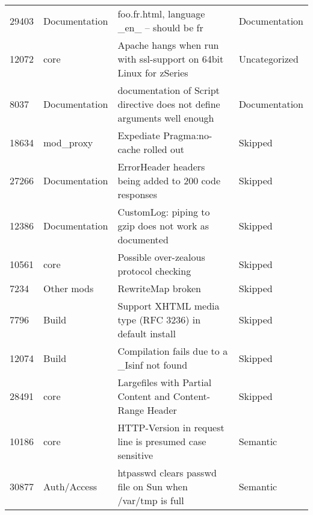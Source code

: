 \begin{longtable}[c]{p{1cm}p{3cm}p{6cm}p{4cm}}
29403  & Documentation      & foo.fr.html, language \_en\_ -- should be fr                                                                   & Documentation     \\
12072  & core               & Apache hangs when run with ssl-support on 64bit Linux for zSeries                                              & Uncategorized     \\
8037   & Documentation      & documentation of Script directive does not define arguments well enough                                        & Documentation     \\
18634  & mod\_proxy         & Expediate Pragma:no-cache rolled out                                                                           & Skipped           \\
27266  & Documentation      & ErrorHeader headers being added to 200 code responses                                                          & Skipped           \\
12386  & Documentation      & CustomLog: piping to gzip does not work as documented                                                          & Skipped           \\
10561  & core               & Possible over-zealous protocol checking                                                                        & Skipped           \\
7234   & Other mods         & RewriteMap broken                                                                                              & Skipped           \\
7796   & Build              & Support XHTML media type (RFC 3236) in default install                                                         & Skipped           \\
12074  & Build              & Compilation fails due to a \_Isinf not found                                                                   & Skipped           \\
28491  & core               & Largefiles with Partial Content and Content-Range Header                                                       & Skipped           \\
10186  & core               & HTTP-Version in request line is presumed case sensitive                                                        & Semantic          \\
30877  & Auth/Access        & htpasswd clears passwd file on Sun when /var/tmp is full                                                       & Semantic          \\

\end{longtable}
